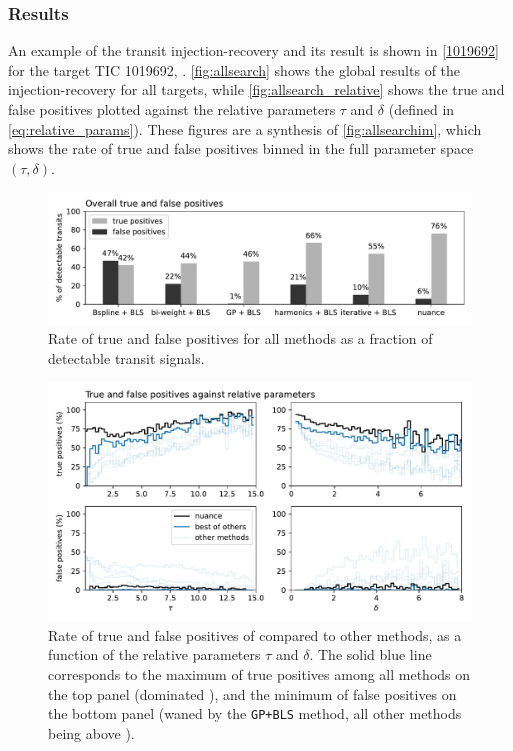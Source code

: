 \documentclass[modern]{aastex631}
\begin{document}
\subsubsection*{Results}
An example of the transit injection-recovery and its result is shown in \autoref{1019692} for the target TIC 1019692, . \autoref{fig:allsearch} shows the global results of the injection-recovery for all targets, while \autoref{fig:allsearch_relative} shows the true and false positives plotted against the relative parameters $\tau$ and $\delta$ (defined in \autoref{eq:relative_params}). These figures are a synthesis of \autoref{fig:allsearchim}, which shows the rate of true and false positives binned in the full parameter space $(\tau, \delta)$.
\begin{figure}[H]
    \begin{centering}
        \includegraphics[width=\linewidth]{./tpfp_bars.pdf}
        \caption{Rate of true and false positives for all methods as a fraction of detectable transit signals. }
        \label{fig:allsearch}
    \end{centering}
\end{figure}
\begin{figure}[H]
    \begin{centering}
        \includegraphics[width=\linewidth]{./tpfp.pdf}
        \caption{Rate of true and false positives of \nuancecode{} compared to other methods, as a function of the relative parameters $\tau$ and $\delta$. The solid blue line corresponds to the maximum of true positives among all methods on the top panel (dominated ), and the minimum of false positives on the bottom panel (waned by the \texttt{GP+BLS} method, all other methods being above \nuancecode{}). }
        \label{fig:allsearch_relative}
    \end{centering}
\end{figure}
\end{document}
